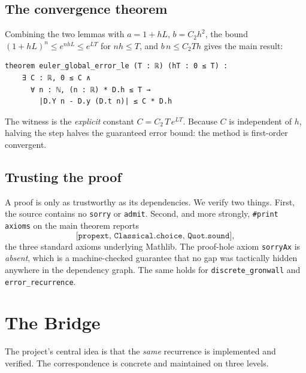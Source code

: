 \documentclass[sigplan,nonacm,screen,review]{acmart}
\begin{document}
\subsection{The convergence theorem}
Combining the two lemmas with $a = 1 + hL$, $b = C_2 h^2$, the bound
$(1+hL)^n \le e^{nhL} \le e^{LT}$ for $nh \le T$, and $b\,n \le C_2 T h$ gives the
main result:

\begin{lstlisting}[language=lean]
theorem euler_global_error_le (T : ℝ) (hT : 0 ≤ T) :
    ∃ C : ℝ, 0 ≤ C ∧
      ∀ n : ℕ, (n : ℝ) * D.h ≤ T →
        |D.Y n - D.y (D.t n)| ≤ C * D.h
\end{lstlisting}

The witness is the \emph{explicit} constant $C = C_2\,T\,e^{LT}$. Because $C$ is
independent of $h$, halving the step halves the guaranteed error bound: the method
is first-order convergent.

\subsection{Trusting the proof}
A proof is only as trustworthy as its dependencies. We verify two things. First,
the source contains no \texttt{sorry} or \texttt{admit}. Second, and more
strongly, \texttt{\#print axioms} on the main theorem reports
\[
  \texttt{[propext, Classical.choice, Quot.sound]},
\]
the three standard axioms underlying Mathlib. The proof-hole axiom
\texttt{sorryAx} is \emph{absent}, which is a machine-checked guarantee that no
gap was tactically hidden anywhere in the dependency graph. The same holds for
\texttt{discrete\_gronwall} and \texttt{error\_recurrence}.

\section{The Bridge}
\label{sec:bridge}

The project's central idea is that the \emph{same} recurrence is implemented and
verified. The correspondence is concrete and maintained on three levels.

\begin{table}[t]
\caption{The correspondence between executed code and proof.}
\label{tab:bridge}
\small
{}
\end{table}
\end{document}
